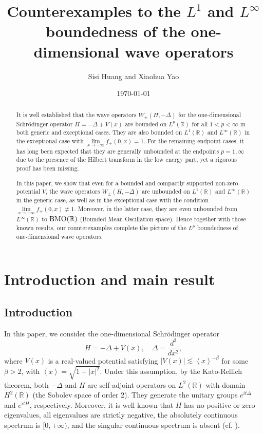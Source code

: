 \documentclass[reqno]{amsart}
\title[Counterexamples to the $L^1$ and $L^{\infty}$ boundedness of wave operators] {Counterexamples to the $L^1$ and $L^{\infty}$ boundedness of the one-dimensional wave operators}
\author{Sisi Huang and Xiaohua Yao}
\date{\today}
\newcommand\R{\mathbb{R}}
\numberwithin{equation}{section}
\begin{document}
\maketitle

\begin{abstract} 
It is well established that the wave operators $W_{\pm}(H,-\Delta)$ for the one-dimensional Schr\"{o}dinger operator $H=-\Delta+V(x)$ are bounded on $L^p(\R)$ for all $1<p<\infty$ in both generic and exceptional cases. They are also bounded on $L^1(\R)$ and $L^{\infty}(\R)$ in the exceptional case with $\lim\limits_{x\rightarrow-\infty}f_+(0,x)=1$. For the remaining endpoint cases, it has long been expected that they are generally unbounded at the endpoints $p=1,\infty$ due to the presence of the Hilbert transform in the low energy part, yet a rigorous proof has been missing.

In this paper, we show that even for a bounded and compactly supported non-zero potential $V$, the wave operators $W_{\pm}(H,-\Delta)$ are unbounded on $L^1(\R)$ and $L^{\infty}(\R)$ in the generic case, as well as in the exceptional case with the  condition $\lim\limits_{x\rightarrow-\infty}f_+(0,x)\neq1$. Moreover, in the latter case, they are even unbounded from $L^{\infty}(\R)$ to ${\rm BMO}(\R)$ (Bounded
Mean Oscillation space). Hence together with those known results, our
counterexamples complete the picture of the $L^{p}$ boundedness of
one-dimensional wave operators. 
\end{abstract}

\tableofcontents

\baselineskip=15pt
\section{Introduction and main result}

\subsection{Introduction}
In this paper, we consider the one-dimensional Schr\"{o}dinger operator 
 $$H=-\Delta+V(x),\quad \Delta=\frac{d^2}{dx^2},$$
where $V(x)$ is a real-valued potential satisfying $|V(x)|\lesssim\left<x\right>^{-\beta}$ for some $\beta>2$, with $\left<x\right>=\sqrt{1+|x|^2}$. Under this assumption, by the Kato-Rellich theorem, both $-\Delta$ and $H$ are self-adjoint operators on $L^2(\R)$ with domain $H^{2}(\mathbb R)$ (the Sobolev space of order $2$). They generate the unitary groups $e^{it\Delta}$ and $e^{itH}$, respectively. Moreover, it is well known that $H$ has no positive or zero eigenvalues, all eigenvalues are strictly negative, the absolutely continuous spectrum is $[0,+\infty)$, and the singular continuous spectrum is absent (cf. \cite{Sim15,Kat95}).
\end{document}
